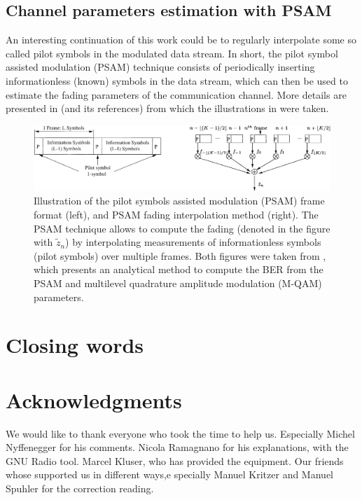 \subsection{Channel parameters estimation with PSAM} \label{sec:psam}

An interesting continuation of this work could be to regularly interpolate some so called pilot symbols in the modulated data stream. In short, the pilot symbol assisted modulation (PSAM) technique consists of periodically inserting informationless (known) symbols in the data stream, which can then be used to estimate the fading parameters of the communication channel. More details are presented in \cite{Xiaoyi1999} (and its references) from which the illustrations in  were taken.

\begin{figure}
	\centering
	\includegraphics[width = \linewidth]{figures/xiaoyi-psam-figures}
	\caption{
		Illustration of the pilot symbols assisted modulation (PSAM) frame format (left), and PSAM fading interpolation method (right). The PSAM technique allows to compute the fading (denoted in the figure with \(\tilde{z}_n\)) by interpolating measurements of informationless symbols (pilot symbols) over multiple frames. Both figures were taken from \cite{Xiaoyi1999}, which presents an analytical method to compute the BER from the PSAM and multilevel quadrature amplitude modulation (M-QAM) parameters.
		\label{fig:psam}
	}
\end{figure}

\section{Closing words}


\section{Acknowledgments}


We would like to thank everyone who took the time to help us. Especially Michel Nyffenegger for his comments. Nicola Ramagnano for his explanations, with the GNU Radio tool. Marcel Kluser, who has provided the equipment. Our friends whose supported us in different ways,e specially Manuel Kritzer and Manuel Spuhler for the correction reading.




